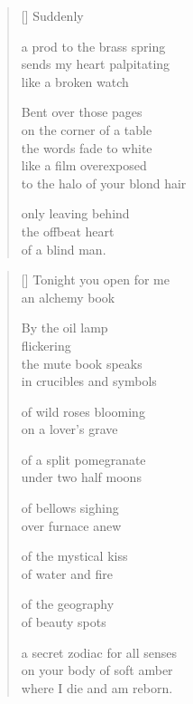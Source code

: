 \documentclass[14pt]{extbook}
\newcommand*{\centeredornament}{\centerline{\pgfornament[width=6cm]{88}}}
\begin{document}
\newpage

\settowidth{\versewidth}{to the halo of your blond hair}

\begin{verse}[\versewidth]
  Suddenly

  a prod to the brass spring \\
  sends my heart palpitating \\
  like a broken watch

  Bent over those pages \\
  on the corner of a table \\
  the words fade to white \\
  like a film overexposed \\
  to the halo of your blond hair

  only leaving behind \\
  the offbeat heart \\
  of a blind man.
\end{verse}


\newpage

\vspace*{-15mm}
\centeredornament
\vspace*{-7mm}


\settowidth{\versewidth}{a secret zodiac for all senses}

\begin{verse}[\versewidth]
  Tonight you open for me \\
  an alchemy book

  By the oil lamp \\
  flickering \\
  the mute book speaks \\
  in crucibles and symbols

  of wild roses blooming \\
  on a lover's grave

  of a split pomegranate \\
  under two half moons

  of bellows sighing \\
  over furnace anew

  of the mystical kiss \\
  of water and fire

  of the geography \\
  of beauty spots

  a secret zodiac for all senses \\
  on your body of soft amber \\
  where I die and am reborn.
\end{verse}
\end{document}

